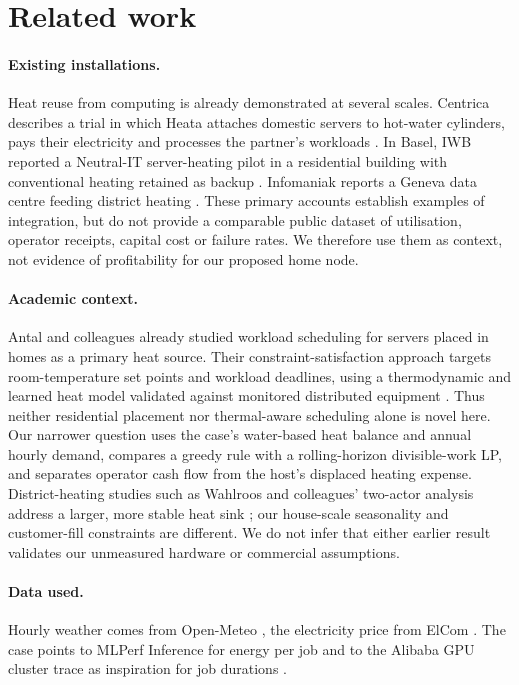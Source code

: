 \section{Related work}
\label{sec:related}

\paragraph{Existing installations.} Heat reuse from computing is already demonstrated at several
scales. Centrica describes a trial in which Heata attaches domestic servers to hot-water cylinders,
pays their electricity and processes the partner's workloads \cite{heata_centrica2025}. In Basel,
IWB reported a Neutral-IT server-heating pilot in a residential building with conventional
heating retained as backup \cite{iwb_neutralit}. Infomaniak reports a Geneva data centre feeding
district heating \cite{infomaniak_d4}. These primary accounts establish examples of integration,
but do not provide a comparable public dataset of utilisation, operator receipts, capital cost or
failure rates. We therefore use them as context, not evidence of profitability for our proposed
home node.

\paragraph{Academic context.} Antal and colleagues already studied workload scheduling for
servers placed in homes as a primary heat source. Their constraint-satisfaction approach
targets room-temperature set points and workload deadlines, using a thermodynamic and learned
heat model validated against monitored distributed equipment \cite{antal2021}. Thus neither
residential placement nor thermal-aware scheduling alone is novel here. Our narrower question
uses the case's water-based heat balance and annual hourly demand, compares a greedy rule with
a rolling-horizon divisible-work LP, and separates operator cash flow from the host's displaced
heating expense. District-heating studies such as Wahlroos and colleagues' two-actor analysis
address a larger, more stable heat sink \cite{wahlroos2017}; our house-scale seasonality and
customer-fill constraints are different. We do not infer that either earlier result validates
our unmeasured hardware or commercial assumptions.

\paragraph{Data used.} Hourly weather comes from Open-Meteo \cite{openmeteo}, the electricity price
from ElCom \cite{elcom}. The case points to MLPerf Inference for energy per job \cite{mlperf} and to
the Alibaba GPU cluster trace as inspiration for job durations \cite{alibaba_trace}.
